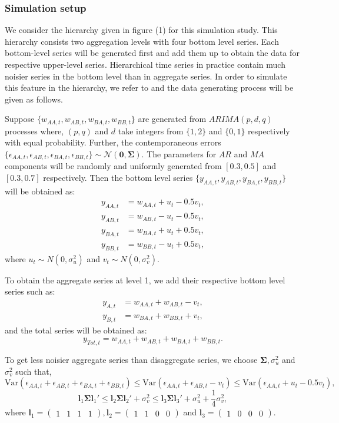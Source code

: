 \documentclass[a4paper, 11pt]{article}
\begin{document}
\subsubsection*{Simulation setup}

We consider the hierarchy given in figure (1) for this simulation study. This hierarchy consists two aggregation levels with four bottom level series. Each bottom-level series will be generated first and add them up to obtain the data for respective upper-level series. Hierarchical time series in practice contain much noisier series in the bottom level than in aggregate series. In order to simulate this feature in the hierarchy, we refer to \citet{Wickramasuriya2017} and the data generating process will be given as follows.

Suppose $\{w_{AA,t},w_{AB,t},w_{BA,t},w_{BB,t}\}$ are generated from $ARIMA(p,d,q)$ processes where, $(p,q)$ and $d$ take integers from $\{1,2\}$ and $\{0,1\}$ respectively with equal probability. Further, the contemporaneous errors $\{\epsilon_{AA,t},\epsilon_{AB,t},\epsilon_{BA,t},\epsilon_{BB,t}\} \sim \mathcal{N}(\bm{0}, \bm{\Sigma})$. The parameters for $AR$ and $MA$ components will be randomly and uniformly generated from $[0.3,0.5]$ and $[0.3,0.7]$ respectively. Then the bottom level series $\{y_{AA,t},y_{AB,t},y_{BA,t},y_{BB,t}\}$ will be obtained as:
\begin{align*}
y_{AA,t} &= w_{AA,t} + u_t - 0.5v_t,\\
y_{AB,t} &= w_{AB,t} - u_t - 0.5v_t,\\
y_{BA,t} &= w_{BA,t} + u_t + 0.5v_t,\\
y_{BB,t} &= w_{BB,t} - u_t + 0.5v_t,
\end{align*}
where $u_t \sim N(0,\sigma^2_u)$ and $v_t \sim N(0,\sigma^2_v)$.

To obtain the aggregate series at level 1, we add their respective bottom level series such as:
\begin{align*}
y_{A,t} &= w_{AA,t} + w_{AB,t} - v_t,\\
y_{B,t} &= w_{BA,t} + w_{BB,t} + v_t,
\end{align*}
and the total series will be obtained as:
$$y_{Tot,t} = w_{AA,t} + w_{AB,t} + w_{BA,t} + w_{BB,t}.$$

To get less noisier aggregate series than disaggregate series, we choose $\bm{\Sigma}, \sigma^2_u$ and $\sigma^2_v$ such that,
$$
\text{Var}(\epsilon_{AA,t}+\epsilon_{AB,t}+\epsilon_{BA,t}+\epsilon_{BB,t}) \le \text{Var}(\epsilon_{AA,t}+\epsilon_{AB,t}-v_t) \le \text{Var}(\epsilon_{AA,t}+u_t-0.5v_t),
$$
$$
\bm{l}_1\bm{\Sigma} \bm{l}_1' \le \bm{l}_2\bm{\Sigma} \bm{l}_2' + \sigma^2_v \le  \bm{l}_3\bm{\Sigma} \bm{l}_3' + \sigma^2_u + \frac{1}{4}\sigma^2_v,
$$
where $\bm{l}_1 = \begin{pmatrix} 1&1&1&1 \end{pmatrix}, \bm{l}_2 = \begin{pmatrix} 1&1&0&0 \end{pmatrix}$ and $\bm{l}_3 = \begin{pmatrix} 1&0&0&0 \end{pmatrix}$.
\end{document}
